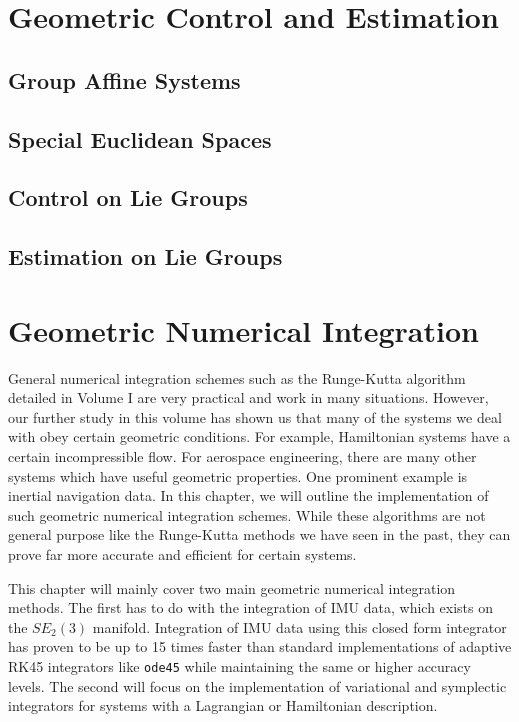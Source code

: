 \newpage
\printendnotes


\chapter{Geometric Control and Estimation}

\section{Group Affine Systems}

\section{Special Euclidean Spaces}

\section{Control on Lie Groups}

\section{Estimation on Lie Groups}


\section{}


\chapter{Geometric Numerical Integration}

General numerical integration schemes such as the Runge-Kutta algorithm detailed in Volume I are very practical and work in many situations. However, our further study in this volume has shown us that many of the systems we deal with obey certain geometric conditions. For example, \gls{Hamiltonian} systems have a certain incompressible flow. For aerospace engineering, there are many other systems which have useful geometric properties. One prominent example is inertial navigation data. In this chapter, we will outline the implementation of such geometric numerical integration schemes. While these algorithms are not general purpose like the Runge-Kutta methods we have seen in the past, they can prove far more accurate and efficient for certain systems.

This chapter will mainly cover two main geometric numerical integration methods. The first has to do with the integration of IMU data, which exists on the $SE_2(3)$ manifold. Integration of IMU data using this closed form integrator has proven to be up to 15 times faster than standard implementations of adaptive RK45 integrators like \texttt{ode45} while maintaining the same or higher accuracy levels. The second will focus on the implementation of variational and symplectic integrators for systems with a \gls{Lagrangian} or \gls{Hamiltonian} description.

